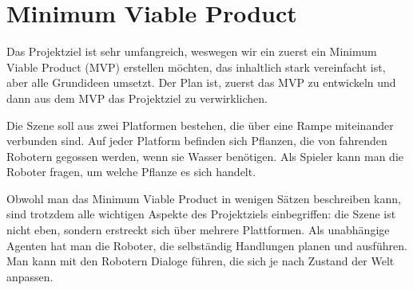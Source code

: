 \section{Minimum Viable Product}

Das Projektziel ist sehr umfangreich, weswegen wir ein zuerst ein Minimum Viable Product (MVP) erstellen möchten, das inhaltlich stark vereinfacht ist, aber alle Grundideen umsetzt. Der Plan ist, zuerst das MVP zu entwickeln und dann aus dem MVP das Projektziel zu verwirklichen.

Die Szene soll aus zwei Platformen bestehen, die über eine Rampe miteinander verbunden sind. Auf jeder Platform befinden sich Pflanzen, die von fahrenden Robotern gegossen werden, wenn sie Wasser benötigen. Als Spieler kann man die Roboter fragen, um welche Pflanze es sich handelt.

Obwohl man das Minimum Viable Product in wenigen Sätzen beschreiben kann, sind trotzdem alle wichtigen Aspekte des Projektziels einbegriffen: die Szene ist nicht eben, sondern erstreckt sich über mehrere Plattformen. Als unabhängige Agenten hat man die Roboter, die selbständig Handlungen planen und ausführen. Man kann mit den Robotern Dialoge führen, die sich je nach Zustand der Welt anpassen.